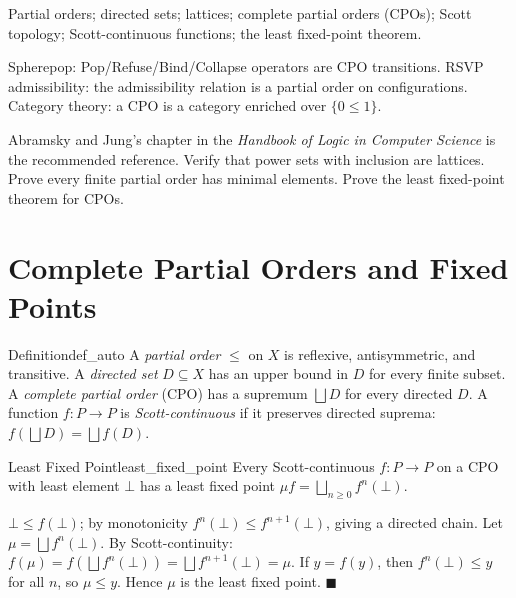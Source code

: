 \documentclass[12pt, twoside, openright, a4paper]{book}
\renewenvironment{proof}{%
  \par\medskip\noindent{\color{RSVPgreen}\bfseries\sffamily Proof.}\enspace\ignorespaces
}{\hfill{\color{RSVPgreen}$\blacksquare$}\par\medskip}
\begin{document}
\begin{structures}
Partial orders; directed sets; lattices; complete partial orders (CPOs); Scott topology; Scott-continuous functions; the least fixed-point theorem.
\end{structures}

\begin{dependencies}
Spherepop: Pop/Refuse/Bind/Collapse operators are CPO transitions.
RSVP admissibility: the admissibility relation is a partial order on configurations.
Category theory: a CPO is a category enriched over $\{0 \leq 1\}$.
\end{dependencies}

\begin{exercises_box}
Abramsky and Jung's chapter in the \textit{Handbook of Logic in Computer Science} is the recommended reference.
Verify that power sets with inclusion are lattices.
Prove every finite partial order has minimal elements.
Prove the least fixed-point theorem for CPOs.
\end{exercises_box}

\section{Complete Partial Orders and Fixed Points}

\begin{definition}{Definition}{def_auto}
A \emph{partial order} $\leq$ on $X$ is reflexive, antisymmetric, and transitive.
A \emph{directed set} $D \subseteq X$ has an upper bound in $D$ for every finite subset.
A \emph{complete partial order} (CPO) has a supremum $\bigsqcup D$ for every directed $D$.
A function $f: P \to P$ is \emph{Scott-continuous} if it preserves directed suprema: $f(\bigsqcup D) = \bigsqcup f(D)$.
\end{definition}

\begin{theorem}{Least Fixed Point}{least_fixed_point}
Every Scott-continuous $f: P \to P$ on a CPO with least element $\bot$ has a least fixed point $\mu f = \bigsqcup_{n \geq 0} f^n(\bot)$.
\end{theorem}
\begin{proof}
$\bot \leq f(\bot)$; by monotonicity $f^n(\bot) \leq f^{n+1}(\bot)$, giving a directed chain.
Let $\mu = \bigsqcup f^n(\bot)$.
By Scott-continuity: $f(\mu) = f(\bigsqcup f^n(\bot)) = \bigsqcup f^{n+1}(\bot) = \mu$.
If $y = f(y)$, then $f^n(\bot) \leq y$ for all $n$, so $\mu \leq y$.
Hence $\mu$ is the least fixed point.
\end{proof}
\end{document}
